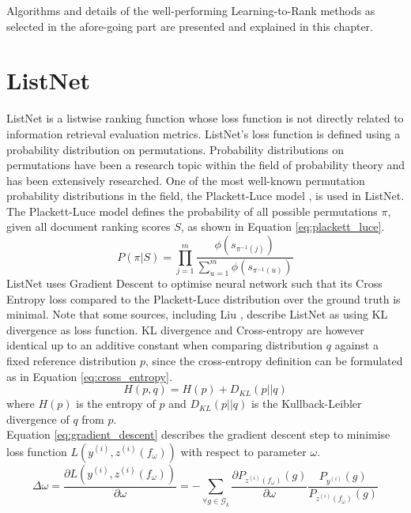 Algorithms and details of the well-performing Learning-to-Rank methods as selected in the afore-going part are presented and explained in this chapter.

\section{ListNet}
ListNet \cite{Cao2007} is a listwise ranking function whose loss function is not directly related to information retrieval evaluation metrics. ListNet's loss function is defined using a probability distribution on permutations. Probability distributions on permutations have been a research topic within the field of probability theory and has been extensively researched. One of the most well-known permutation probability distributions in the field, the Plackett-Luce model \cite{Plackett1975,Luce1959}, is used in ListNet. The Plackett-Luce model defines the probability of all possible permutations $\pi$, given all document ranking scores $S$, as shown in Equation \ref{eq:plackett_luce}.
\begin{equation}
P(\pi|S) = \prod\limits_{j=1}^{m}\frac{\phi(s_{\pi^{-1}(j)})}{\sum\nolimits_{u=1}^{m}\phi(s_{\pi^{-1}(u)})}
\label{eq:plackett_luce}
\end{equation}
ListNet uses Gradient Descent to optimise neural network such that its Cross Entropy loss compared to the Plackett-Luce distribution over the ground truth is minimal. Note that some sources, including Liu \cite{Liu2007}, describe ListNet as using KL divergence as loss function. KL divergence and Cross-entropy are however identical up to an additive constant when comparing distribution $q$ against a fixed reference distribution $p$, since the cross-entropy definition can be formulated as in Equation \ref{eq:cross_entropy}.
\begin{equation}
H(p,q) = H(p) + D_{KL}(p||q)
\label{eq:cross_entropy}
\end{equation}
where $H(p)$ is the entropy of $p$ and $D_{KL}(p||q)$ is the Kullback-Leibler divergence of $q$ from $p$.\\

\noindent Equation \ref{eq:gradient_descent} describes the gradient descent step to minimise loss function $L(y^{(i)},z^{(i)}(f_\omega))$ with respect to parameter $\omega$. 
\begin{equation}
\Delta\omega = \frac{\partial L(y^{(i)},z^{(i)}(f_\omega))}{\partial \omega} = - \sum_{\forall g \in \mathscr{G}_k}\limits\frac{\partial P_{z^{(i)}(f_\omega)}(g)}{\partial \omega}\frac{P_{y^{(i)}}(g)}{P_{z^{(i)}(f_\omega)}(g)}
\label{eq:gradient_descent}
\end{equation}


